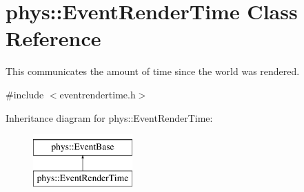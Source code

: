 \hypertarget{classphys_1_1EventRenderTime}{
\section{phys::EventRenderTime Class Reference}
\label{d3/d8b/classphys_1_1EventRenderTime}
}


This communicates the amount of time since the world was rendered.  




{\ttfamily \#include $<$eventrendertime.h$>$}

Inheritance diagram for phys::EventRenderTime:\begin{figure}[H]
\begin{center}
\leavevmode
\includegraphics[height=2.000000cm]{d3/d8b/classphys_1_1EventRenderTime}
\end{center}
\end{figure}
